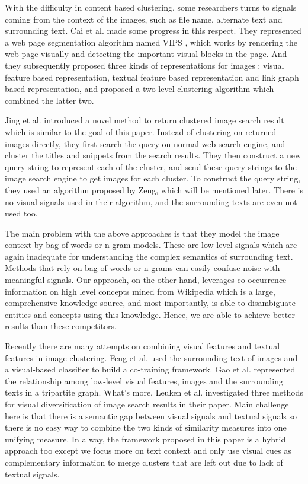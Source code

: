 With the difficulty in content based clustering,
some researchers turns to signals coming from the context of the images, 
such as file name, alternate text and surrounding text. 
Cai et al. made some progress in this respect.
They represented a web page segmentation algorithm named VIPS \cite{VIPS},
which works by rendering the web page visually and detecting
the important visual blocks in the page. And they subsequently proposed three
kinds of representations for images \cite{Cai2004b,Cai2004}:
visual feature based representation, textual feature based representation and
link graph based representation, and proposed a two-level clustering algorithm
which combined the latter two.

Jing et al. \cite{Jing2006} introduced a novel method to return clustered image
search result which is similar to the goal of this paper.
Instead of clustering on returned images directly, they first search the query
on normal web search engine, and cluster the titles and snippets from the search results.
They then construct a new query string to represent each of the cluster, and
send these query strings to the image search engine to get images for each
cluster. To construct the query string, they used an algorithm
proposed by Zeng\cite{Zeng2004}, which will be mentioned later.
There is no visual signals used in their algorithm, and the surrounding texts
are even not used too.

The main problem with the above approaches is that they model the image context
by bag-of-words or n-gram models. These are low-level signals which are again
inadequate for understanding the complex semantics of surrounding text. Methods
that rely on bag-of-words or n-grams can easily confuse noise with meaningful
signals. Our approach, on the other hand, leverages co-occurrence information on
high level concepts mined from Wikipedia which is a large, comprehensive knowledge
source, and most importantly, is able to disambiguate entities and concepts using
this knowledge. Hence, we are able to achieve better results than
these competitors.

Recently there are many attempts on combining visual features and textual features in
image clustering. Feng et al. \cite{Feng2004} used the surrounding text of images
and a visual-based classifier to build a co-training framework.
Gao et al.\cite{Gao2005} represented the relationship among low-level visual features,
images and the surrounding texts in a tripartite graph. What's more, Leuken et al.
\cite{LeukenPOZ09} investigated three methods for visual diversification of
image search results in their paper. Main challenge here is that there is a
semantic gap between visual signals and textual signals so there is no easy way
to combine the two kinds of similarity measures into one unifying measure. 
In a way, the framework proposed in this paper is a hybrid approach too except
we focus more on text context and only use visual cues as complementary information
to merge clusters that are left out due to lack of textual signals.

